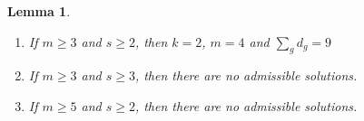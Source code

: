 \documentclass[12pt,twoside,]{amsart}
\theoremstyle{plain}
\newtheorem{lemma}[theorem]{Lemma}
\theoremstyle{definition}
\begin{document}
\begin{lemma}\label{m atleast 3}
   \begin{enumerate}
       \item If $m \geq 3$ and $s \geq 2$, then $k = 2$, $m = 4$ and $\sum_g d_g = 9$
       \item If $m \geq 3$ and $s \geq 3$, then there are no admissible solutions.
       \item If $m \geq 5$ and $s \geq 2$, then there are no admissible solutions.
       
   \end{enumerate}
    
\end{lemma}
\end{document}
